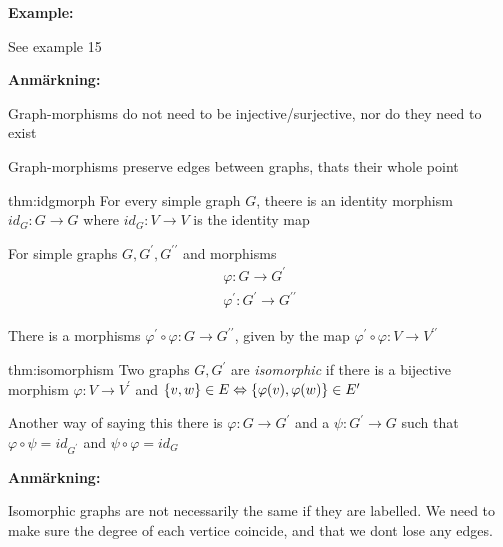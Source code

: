 \par\bigskip
\noindent\textbf{Example:}\par
\noindent See example 15
\par\bigskip
\noindent\textbf{Anmärkning:}\par
\noindent Graph-morphisms do not need to be injective/surjective, nor do they need to exist
\par\bigskip
\noindent Graph-morphisms preserve edges between graphs, thats their whole point
\par\bigskip
\begin{theo}{thm:idgmorph}
  For every simple graph $G$, theere is an identity morphism $id_G:G\to G$ where $id_G:V\to V$ is the identity map
  \par\bigskip
  \noindent For simple graphs $G,G^{\prime}, G^{\prime\prime}$ and morphisms
  \begin{equation*}
    \begin{gathered}
      \varphi:G\to G^{\prime}\\
      \varphi^{\prime}:G^{\prime}\to G^{\prime\prime}
    \end{gathered}
  \end{equation*}\par
  \noindent There is a morphisms $\varphi^{\prime}\circ\varphi:G\to G^{\prime\prime}$, given by the map $\varphi^{\prime}\circ\varphi:V\to V^{\prime\prime}$
\end{theo}
\par\bigskip
\begin{theo}[Isomorphism]{thm:isomorphism}
Two graphs $G,G^{\prime}$ are \textit{isomorphic} if there is a bijective morphism $\varphi:V\to V^{\prime}$ and $\left\{v,w\right\}\in E\Leftrightarrow \left\{\varphi(v),\varphi(w)\right\}\in E^{\prime}$
  \par\bigskip
  \noindent Another way of saying this there is $\varphi:G\to G^{\prime}$ and a $\psi:G^{\prime}\to G$ such that $\varphi\circ\psi = id_{G^{\prime}}$ and $\psi\circ\varphi = id_G$
\end{theo}
\par\bigskip
\noindent\textbf{Anmärkning:}\par
\noindent Isomorphic graphs are not necessarily the same if they are labelled. We need to make sure the degree of each vertice coincide, and that we dont lose any edges.
\par\bigskip
